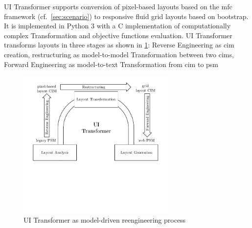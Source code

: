 UI Transformer supports conversion of pixel-based  layouts based on the \gls{mfc} framework (cf.~\cref{sec:scenario}) to responsive fluid grid layouts based on bootstrap.
It is implemented in Python 3 with a C implementation of computationally complex \gls{Transformation} and objective functions evaluation.
UI Transformer transforms \legacy layouts in three stages as shown in \cref{fig:awsm.rm.uitransformer.horseshoe}: \gls{Reverse Engineering} as \gls{cim} creation, restructuring as model-to-model \gls{Transformation} between two \glspl{cim}, \gls{Forward Engineering} as model-to-text \gls{Transformation} from \gls{cim} to \gls{psm}
\begin{figure}[h!]
\hypertarget{fig:awsm.rm.uitransformer.horseshoe}{%
\centering
\includegraphics[width=0.7\textwidth]{../figures/awsm-rm-ui-transformation-horseshoe.pdf}
\caption{UI Transformer as model-driven reengineering process}\label{fig:awsm.rm.uitransformer.horseshoe}
}
\end{figure}


